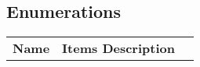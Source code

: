 \subsection{Enumerations}

\begin{tabular}{lp{3.0cm}l}
\bfseries Name & \bfseries Items \bfseries Description\\
\end{tabular}